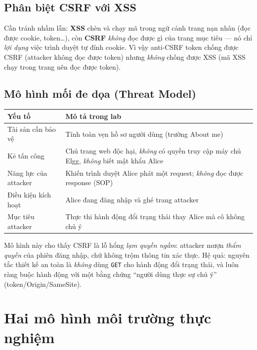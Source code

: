 \documentclass[11pt,a4paper]{article}
\begin{document}
\subsection{Phân biệt CSRF với XSS}
Cần tránh nhầm lẫn: \textbf{XSS} chèn và chạy mã trong ngữ cảnh trang nạn nhân (đọc được cookie, token\ldots), còn \textbf{CSRF} \emph{không} đọc được gì của trang mục tiêu — nó chỉ \emph{lợi dụng} việc trình duyệt tự đính cookie. Vì vậy anti-CSRF token chống được CSRF (attacker không đọc được token) nhưng \emph{không} chống được XSS (mã XSS chạy trong trang nên đọc được token).

\subsection{Mô hình mối đe dọa (Threat Model)}
\begin{center}\small
\begin{tabularx}{\linewidth}{@{}l Y@{}}
\toprule
\textbf{Yếu tố} & \textbf{Mô tả trong lab}\\
\midrule
Tài sản cần bảo vệ & Tính toàn vẹn hồ sơ người dùng (trường About me)\\
Kẻ tấn công & Chủ trang web độc hại, \emph{không} có quyền truy cập máy chủ Elgg, \emph{không} biết mật khẩu Alice\\
Năng lực của attacker & Khiến trình duyệt Alice phát một request; \emph{không} đọc được response (SOP)\\
Điều kiện kích hoạt & Alice đang đăng nhập và ghé trang attacker\\
Mục tiêu attacker & Thực thi hành động đổi trạng thái thay Alice mà cô không chủ ý\\
\bottomrule
\end{tabularx}
\end{center}
\noindent Mô hình này cho thấy CSRF là lỗ hổng \emph{lạm quyền ngầm}: attacker mượn \emph{thẩm quyền} của phiên đăng nhập, chứ không trộm thông tin xác thực. Hệ quả: nguyên tắc thiết kế an toàn là \emph{không} dùng \texttt{GET} cho hành động đổi trạng thái, và luôn ràng buộc hành động với một bằng chứng ``người dùng thực sự chủ ý'' (token/Origin/SameSite).

\section{Hai mô hình môi trường thực nghiệm}
\end{document}
